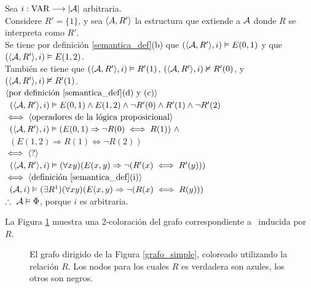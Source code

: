 \begin{enumerate}
Sea $i : \text{VAR} \longrightarrow |\mathcal{A}|$ arbitraria.\\
Considere $R' = \{1\}$, y sea $\langle A, R' \rangle$ la estructura que extiende a $\mathcal{A}$
donde $R$ se interpreta como $R'$.\\
Se tiene por definición \ref{semantica_def}(b) que $(\langle \mathcal{A}, R' \rangle,i) 
\vDash E(0,1)$ y que \mbox{$(\langle \mathcal{A}, R' \rangle,i) \vDash E(1,2)$}.\\
También se tiene que $(\langle \mathcal{A}, R' \rangle, i) \vDash R'(1)$, 
$(\langle \mathcal{A}, R' \rangle, i) \nvDash R'(0)$, y $(\langle \mathcal{A}, R' \rangle, i) \nvDash R'(1)$.\\
$\langle \text{por definición \ref{semantica_def}(d) y (c)} \rangle$\\
\mbox{\hspace{5mm} $(\langle \mathcal{A}, R' \rangle, i) \vDash E(0,1) \land E(1,2) \land \neg
R'(0) \land R'(1) \land \neg R'(2)$}\\
$\iff \langle \text{operadores de la lógica proposicional} \rangle$\\
\mbox{\hspace{5mm} $(\langle \mathcal{A}, R' \rangle, i) \vDash (E(0,1) \Rightarrow \neg R(0)
\iff R(1))\ \land$} \\ 
\mbox{\hspace{30mm} $(E(1,2) \Rightarrow R(1) \iff \neg R(2))$}\\
$\iff \langle \text{?} \rangle$\\
\mbox{\hspace{5mm} $(\langle \mathcal{A}, R' \rangle, i) 
\vDash (\forall xy)(E(x, y) \Rightarrow \neg(R'(x) \iff R'(y)))$}\\
$\iff \langle \text{definición \ref{semantica_def}(i)} \rangle$\\
\mbox{\hspace{5mm} $(\mathcal{A}, i) 
\vDash (\exists R^1)(\forall xy)(E(x, y) \Rightarrow \neg(R(x) \iff R(y)))$}\\
$\therefore\ \mathcal{A} \vDash \Phi$, porque $i$ es arbitraria.
\end{enumerate}

La Figura \ref{grafo_coloreado} muestra una 2-coloración del grafo correspondiente a \A
\ inducida por $R$.

\begin{figure}[h]
\begin{center}
\end{center}
\caption[Grafo dirigido coloreado por una relación]{El grafo dirigido de la Figura \ref{grafo_simple}, coloreado
utilizando la relación $R$. Los nodos para los cuales $R$ es verdadera son
azules, los otros son negros.}
\label{grafo_coloreado}
\end{figure}

